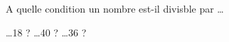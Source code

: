 %
%
A quelle condition un nombre est-il divisble par \dots
    \begin{tasks}
        \task \dots 18 ? \dotfillbox[\linewidth]
        \task \dots 40 ? \dotfillbox[\linewidth]
        \task \dots 36 ? \dotfillbox[\linewidth]
    \end{tasks}
